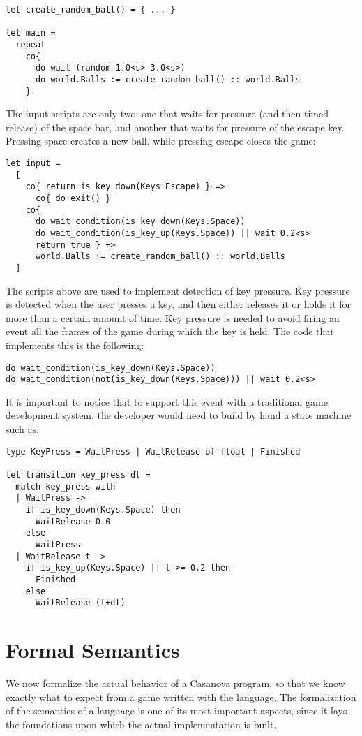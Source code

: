 \begin{lstlisting}
let create_random_ball() = { ... }

let main = 
  repeat
    co{
      do wait (random 1.0<s> 3.0<s>)
      do world.Balls := create_random_ball() :: world.Balls
    }
\end{lstlisting}

The input scripts are only two: one that waits for pressure (and then timed release) of the space bar, and another that waits for pressure of the escape key. Pressing space creates a new ball, while pressing escape closes the game:

\begin{lstlisting}
let input =
  [
    co{ return is_key_down(Keys.Escape) } => 
      co{ do exit() }
    co{
      do wait_condition(is_key_down(Keys.Space))
      do wait_condition(is_key_up(Keys.Space)) || wait 0.2<s>
      return true } =>
      world.Balls := create_random_ball() :: world.Balls
  ]
\end{lstlisting}

The scripts above are used to implement detection of key pressure. Key pressure is detected when the user presses a key, and then either releases it or holds it for more than a certain amount of time. Key pressure is needed to avoid firing an event all the frames of the game during which the key is held. The code that implements this is the following:

\begin{lstlisting}
do wait_condition(is_key_down(Keys.Space))
do wait_condition(not(is_key_down(Keys.Space))) || wait 0.2<s>
\end{lstlisting}

It is important to notice that to support this event with a traditional game development system, the developer would need to build by hand a state machine such as:

\begin{lstlisting}
type KeyPress = WaitPress | WaitRelease of float | Finished

let transition key_press dt =
  match key_press with
  | WaitPress -> 
    if is_key_down(Keys.Space) then 
      WaitRelease 0.0
    else
      WaitPress
  | WaitRelease t ->
    if is_key_up(Keys.Space) || t >= 0.2 then 
      Finished
    else
      WaitRelease (t+dt)
\end{lstlisting}

\section{Formal Semantics}
We now formalize the actual behavior of a Casanova program, so that we know exactly what to expect from a game written with the language. The formalization of the semantics of a language is one of its most important aspects, since it lays the foundations upon which the actual implementation is built. 

